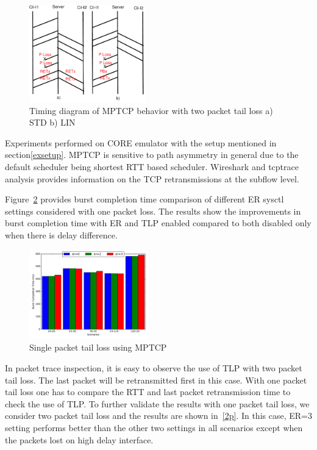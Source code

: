 \documentclass[10pt,draftcls,twocolumn]{IEEEconf}
\begin{document}
\begin{figure}[!ht]
\begin{center}
\includegraphics[angle=0, width=0.45\textwidth, natwidth=610, natheight=400]{images/timing2P.pdf}
\end{center}
\caption{Timing diagram of MPTCP behavior with two packet tail loss a) STD b) LIN}\label{timing2P}
\end{figure}



Experiments performed on CORE emulator with the setup mentioned in section\ref{exsetup}.
MPTCP is sensitive to path asymmetry in general due to the default scheduler being shortest RTT based scheduler. Wireshark and tcptrace
analysis provides information on the TCP retransmissions at the subflow level.  


Figure~\ref{1p} provides burst completion time comparison of different ER sysctl settings considered with one packet loss. The results show the improvements
in burst completion time with ER and TLP enabled compared to both disabled only when there is delay difference.

\begin{figure}[!ht]
\begin{center}
\includegraphics[angle=0, width=0.46\textwidth,natwidth=578.16,natheight=433.62]{plots/1P.pdf}
\caption{Single packet tail loss using MPTCP}\label{1p}
\end{center}
\end{figure}

In packet trace inspection, it is easy to observe the use of TLP with two packet tail loss. The last packet will be retransmitted first in this case.
With one packet tail loss one has to compare the RTT and last packet retransmission time to check the use of TLP.
To further validate the results with one packet tail loss, we consider two packet tail loss and the results are shown in~\ref{2p}.
In this case, ER=3 setting performs better than the other two settings in all scenarios except when the packets lost on high delay interface. 
\end{document}
